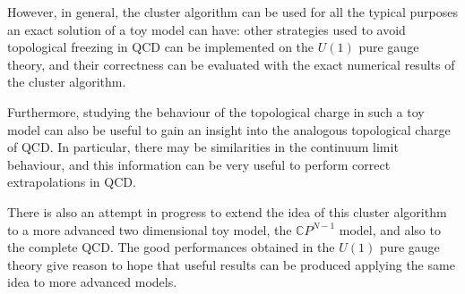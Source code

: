However, in general, the cluster algorithm can be used for all the typical purposes an exact solution of a toy model can have:
other strategies used to avoid topological freezing in QCD can be implemented on the $U(1)$ pure gauge theory,
and their correctness can be evaluated with the exact numerical results of the cluster algorithm.

Furthermore, studying the behaviour of the topological charge in such a toy model can also be useful to gain an insight into the analogous topological charge of QCD.
In particular, there may be similarities in the continuum limit behaviour, and this information can be very useful to perform correct extrapolations in QCD.

There is also an attempt in progress to extend the idea of this cluster algorithm to a more advanced two dimensional toy model,
the $\mathbb CP^{N-1}$ model, and also to the complete QCD.
The good performances obtained in the $U(1)$ pure gauge theory give reason to hope that useful results can be produced applying the same idea to more advanced models.

